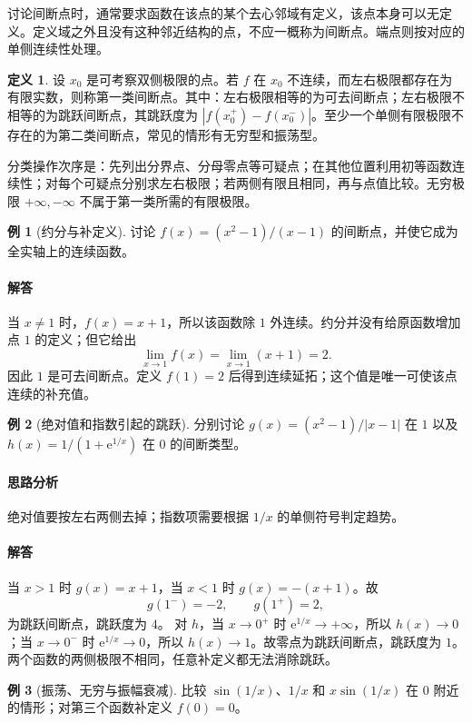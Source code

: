 \documentclass[UTF8,fontset=fandol,12pt,oneside,openany]{ctexrep}
\newcommand{\ee}{\mathrm e}
\theoremstyle{definition}
\newtheorem{definition}[theorem]{定义}
\newtheorem{example}{例}[chapter]
\begin{document}
讨论间断点时，通常要求函数在该点的某个去心邻域有定义，该点本身可以无定义。定义域之外且没有这种邻近结构的点，不应一概称为间断点。端点则按对应的单侧连续性处理。

\begin{definition}
设 $x_0$ 是可考察双侧极限的点。若 $f$ 在 $x_0$ 不连续，而左右极限都存在为有限实数，则称第一类间断点。其中：左右极限相等的为可去间断点；左右极限不相等的为跳跃间断点，其跳跃度为 $|f(x_0^+)-f(x_0^-)|$。至少一个单侧有限极限不存在的为第二类间断点，常见的情形有无穷型和振荡型。
\end{definition}

分类操作次序是：先列出分界点、分母零点等可疑点；在其他位置利用初等函数连续性；对每个可疑点分别求左右极限；若两侧有限且相同，再与点值比较。无穷极限 $+\infty,-\infty$ 不属于第一类所需的有限极限。

\begin{example}[约分与补定义]
讨论 $f(x)=(x^2-1)/(x-1)$ 的间断点，并使它成为全实轴上的连续函数。
\end{example}
\paragraph{解答}
当 $x\ne1$ 时，$f(x)=x+1$，所以该函数除 $1$ 外连续。约分并没有给原函数增加点 $1$ 的定义；但它给出
\[
 \lim_{x\to1}f(x)=\lim_{x\to1}(x+1)=2.
\]
因此 $1$ 是可去间断点。定义 $f(1)=2$ 后得到连续延拓；这个值是唯一可使该点连续的补充值。

\begin{example}[绝对值和指数引起的跳跃]
分别讨论 $g(x)=(x^2-1)/|x-1|$ 在 $1$ 以及 $h(x)=1/(1+\ee^{1/x})$ 在 $0$ 的间断类型。
\end{example}
\paragraph{思路分析}
绝对值要按左右两侧去掉；指数项需要根据 $1/x$ 的单侧符号判定趋势。
\paragraph{解答}
当 $x>1$ 时 $g(x)=x+1$，当 $x<1$ 时 $g(x)=-(x+1)$。故
\[
 g(1^- )=-2,\qquad g(1^+)=2,
\]
为跳跃间断点，跳跃度为 $4$。
对 $h$，当 $x\to0^+$ 时 $\ee^{1/x}\to+\infty$，所以 $h(x)\to0$；当 $x\to0^-$ 时 $\ee^{1/x}\to0$，所以 $h(x)\to1$。故零点为跳跃间断点，跳跃度为 $1$。两个函数的两侧极限不相同，任意补定义都无法消除跳跃。

\begin{example}[振荡、无穷与振幅衰减]
比较 $\sin(1/x)$、$1/x$ 和 $x\sin(1/x)$ 在 $0$ 附近的情形；对第三个函数补定义 $f(0)=0$。
\end{example}
\end{document}
